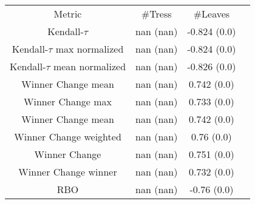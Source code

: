 \begin{tabular}{c|c|c|c} 
Metric & #Tress & #Leaves \\ 
Kendall-$\tau$ & nan (nan) & -0.824 (0.0)   \\ 
Kendall-$\tau$ max normalized & nan (nan) & -0.824 (0.0)   \\ 
Kendall-$\tau$ mean normalized & nan (nan) & -0.826 (0.0)   \\ 
Winner Change mean& nan (nan) & 0.742 (0.0)   \\ 
Winner Change max & nan (nan) & 0.733 (0.0)   \\ 
Winner Change mean & nan (nan) & 0.742 (0.0)   \\ 
Winner Change weighted & nan (nan) & 0.76 (0.0)   \\ 
Winner Change & nan (nan) & 0.751 (0.0)   \\ 
Winner Change winner & nan (nan) & 0.732 (0.0)   \\ 
RBO & nan (nan) & -0.76 (0.0)   \\ 
\end{tabular}